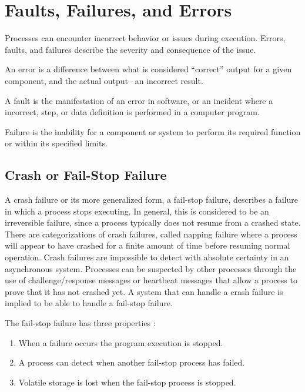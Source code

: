 \section{Faults, Failures, and Errors}

Processes can encounter incorrect behavior or issues during execution.
Errors, faults, and failures describe the severity and consequence of the issue.

\begin{pdef}
An error is a difference between what is considered ``correct'' output for a given component, and the actual output-- an incorrect result.
\end{pdef}

\begin{pdef}
A fault is the manifestation of an error in software, or an incident where a incorrect, step, or data definition is performed in a computer program.
\end{pdef}

\begin{pdef}
Failure is the inability for a component or system to perform its required function or within its specified limits.
\end{pdef}

\subsection{Crash or Fail-Stop Failure}

A crash failure or its more generalized form, a fail-stop failure, describes a failure in which a process stops executing.
In general, this is considered to be an irreversible failure, since a process typically does not resume from a crashed state.
There are categorizations of crash failures, called napping failure where a process will appear to have crashed for a finite amount of time before resuming normal operation.
Crash failures are impossible to detect with absolute certainty in an asynchronous system.
Processes can be suspected by other processes through the use of challenge/response messages or heartbeat messages that allow a process to prove that it has not crashed yet.
A system that can handle a crash failure is implied to be able to handle a fail-stop failure.\cite{DISTRIBUTED}

The fail-stop failure has three properties \cite{DISTRIBUTED}:

\begin{enumerate}
\item When a failure occurs the program execution is stopped.
\item A process can detect when another fail-stop process has failed.
\item Volatile storage is lost when the fail-stop process is stopped.
\end{enumerate}

